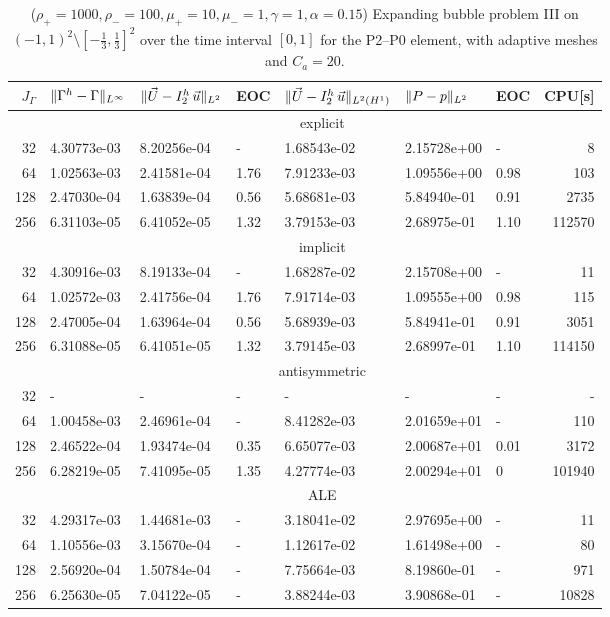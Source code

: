 \begin{table}
\center
\hspace*{-3.25cm}
\begin{tabular}{rllllllr}
\hline
$J_\Gamma$ & $\|\Gamma^h - \Gamma\|_{L^\infty}$ & $\|\vec U - I^h_{2}\,\vec u\|_{L^2}$ & EOC & $\|\vec U - I^h_{2}\,\vec u\|_{L^2(H^1)}$ & $\|P - p\|_{L^2}$ & EOC
& CPU[s] \\
\hline
& \multicolumn{7}{c}{explicit} \\
\hline
 32 & 4.30773e-03 & 8.20256e-04 &    - & 1.68543e-02 & 2.15728e+00 &    - &
8 \\
 64 & 1.02563e-03 & 2.41581e-04 & 1.76 & 7.91233e-03 & 1.09556e+00 & 0.98 &
103 \\
128 & 2.47030e-04 & 1.63839e-04 & 0.56 & 5.68681e-03 & 5.84940e-01 & 0.91 &
2735 \\
256 & 6.31103e-05 & 6.41052e-05 & 1.32 & 3.79153e-03 & 2.68975e-01 & 1.10 &
112570 \\
\hline
& \multicolumn{7}{c}{implicit} \\
\hline
 32 & 4.30916e-03 & 8.19133e-04 &    - & 1.68287e-02 & 2.15708e+00 &    - &
11 \\
 64 & 1.02572e-03 & 2.41756e-04 & 1.76 & 7.91714e-03 & 1.09555e+00 & 0.98 &
115 \\
128 & 2.47005e-04 & 1.63964e-04 & 0.56 & 5.68939e-03 & 5.84941e-01 & 0.91 &
3051 \\
256 & 6.31088e-05 & 6.41051e-05 & 1.32 & 3.79145e-03 & 2.68997e-01 & 1.10 &
114150 \\
\hline
& \multicolumn{7}{c}{antisymmetric} \\
\hline
 32 &           - &           - &    - &           - &           - &    - &
- \\
 64 & 1.00458e-03 & 2.46961e-04 &    - & 8.41282e-03 & 2.01659e+01 &    - &
110 \\
128 & 2.46522e-04 & 1.93474e-04 & 0.35 & 6.65077e-03 & 2.00687e+01 & 0.01 &
3172 \\
256 & 6.28219e-05 & 7.41095e-05 & 1.35 & 4.27774e-03 & 2.00294e+01 &    0 &
101940 \\
\hline
& \multicolumn{7}{c}{ALE} \\
\hline
 32 & 4.29317e-03 & 1.44681e-03 & - & 3.18041e-02 & 2.97695e+00 & - &    11 \\
 64 & 1.10556e-03 & 3.15670e-04 & - & 1.12617e-02 & 1.61498e+00 & - &    80 \\
128 & 2.56920e-04 & 1.50784e-04 & - & 7.75664e-03 & 8.19860e-01 & - &   971 \\
256 & 6.25630e-05 & 7.04122e-05 & - & 3.88244e-03 & 3.90868e-01 & - & 10828 \\
\hline
\end{tabular}
\hspace*{-3.25cm}
\caption[Navier--Stokes expanding bubble III errors P2--P0]
{($\rho_+ = 1000,\rho_- = 100,\mu_+ = 10,\mu_- =1,\gamma = 1,\alpha=0.15$)
Expanding bubble problem III on $(-1,1)^2\setminus[-\frac{1}{3},\frac{1}{3}]^2$
over the time interval $[0,1]$ for the P2--P0 element, with adaptive
meshes and $C_a=20$\textdegree.}
\label{tab:nsexpandingbubbleIIIp2p0}
\end{table}

